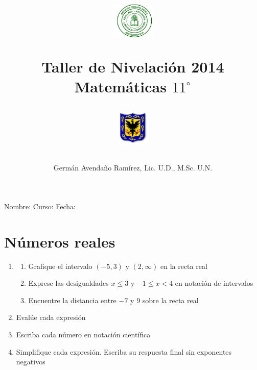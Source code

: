 \documentclass[10pt,twoside]{article}
\author{Germ\'an Avenda\~no Ram\'irez, Lic. U.D., M.Sc. U.N.}
\title{\begin{minipage}{.2\textwidth}
\includegraphics[height=1.75cm]{Images/logo-colegio.png}\end{minipage}
\begin{minipage}{.55\textwidth}
\begin{center}
Taller de Nivelación 2014\\
Matemáticas $11^{\circ}$
\end{center}
\end{minipage}\hfill
\begin{minipage}{.2\textwidth}
\includegraphics[height=1.75cm]{Images/logo-sed.png} 
\end{minipage}}
\date{}
\begin{document}
\maketitle
Nombre: \hrulefill Curso: \underline{\hspace*{44pt}} Fecha: \underline{\hspace*{2.5cm}}
\section*{N\'{u}meros reales}
\begin{enumerate}
\item 
\begin{enumerate}
\item Grafique el intervalo $(-5,3)$ y $(2,\infty)$ en la recta real
\item Exprese las desigualdades $x\leq 3$ y $-1\leq x<4$ en notación de intervalos
\item Encuentre la distancia entre $-7$ y $9$ sobre la recta real
\end{enumerate}
\item Evalúe cada expresión
\begin{enumerate}
\end{enumerate}
\item Escriba cada n\'{u}mero en notaci\'{o}n cient\'{i}fica
\begin{enumerate}
\end{enumerate}
\item Simplifique cada expresión. Escriba su respuesta final sin exponentes negativos
\begin{enumerate}
\end{enumerate}
\end{enumerate}
\end{document}
